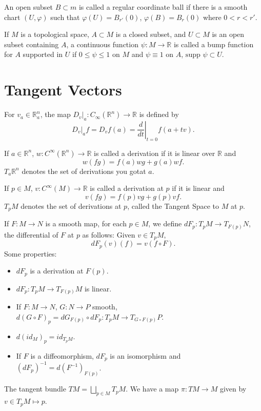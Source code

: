 \documentclass[12pt]{scrartcl}
\newcommand{\R}{\mathbb{R}}
\newcommand\at[2]{\left.#1\right|_{#2}}
\let \phi \varphi
\newcommand{\supp}{\text{supp }}
\begin{document}
\begin{definition} An open subset $B \subset m$ is called a regular coordinate ball if there is a smooth chart $(U, \phi)$ such that $\phi(U) = B_{r'}(0)$, $\phi(B) = B_r(0)$ where $0 < r < r'$.
\end{definition}

\begin{definition} If $M$ is a topological space, $A \subset M$ is a closed subset, and $U \subset M$ is an open subset containing $A$, a continuous function $\psi: M \to \R$ is called a bump function for $A$ supported in $U$ if $0 \le \psi \le 1$ on $M$ and $\psi \equiv 1$ on $A$, $\supp \psi \subset U$.
\end{definition}

\section{Tangent Vectors}
\begin{definition} For $v_a \in \R_a^n$, the map $D_v\vert_a: C_\infty(\R^n) \to \R$ is defined by
$$D_v\vert_a f = D_vf(a) = \at{\frac{d}{dt}}{t=0}f(a + tv).$$
\end{definition}
\begin{definition} If $a \in \R^n$, $w: C^\infty(\R^n) \to \R$ is called a derivation if it is linear over $\R$ and 
$$w(fg) = f(a)wg + g(a)wf.$$
$T_a\R^n$ denotes the set of derivations you gotat $a$.
\end{definition}
\begin{definition} If $p \in M$, $v: C^\infty(M) \to \R$ is called a derivation at $p$ if it is linear and
$$v(fg) = f(p)vg + g(p)vf.$$
$T_pM$ denotes the set of derivations at $p$, called the Tangent Space to $M$ at $p$.
\end{definition}
\begin{definition} If $F:M \to N$ is a smooth map, for each $p \in M$, we define 
$dF_p: T_pM \to T_{F(p)}N$, the differential of $F$ at $p$ as follows:  Given $v \in T_pM$, $$dF_p(v)(f) = v(f \circ F).$$
Some properties:
\begin{itemize}
\item $dF_p$ is a derivation at $F(p)$.
\item $dF_p: T_pM \to T_{F(p)}M$ is linear.
\item If $F:M\to N$, $G: N \to P$ smooth, $d(G \circ F)_p = dG_{F(p)}\circ dF_p:T_pM \to T_{G \circ F(p)}P$.
\item $d(id_M)_p = id_{T_pM}$.
\item If $F$ is a diffeomorphism, $dF_p$ is an isomorphism and $(dF_p)^{-1} = d(F^{-1})_{F(p)}$.
\end{itemize}

\end{definition}
\begin{definition} The tangent bundle $TM = \bigsqcup_{p\in M} T_pM$.  We have a map $\pi: TM \to M$ given by $v \in T_pM \mapsto p$.
\end{definition}
\end{document}
